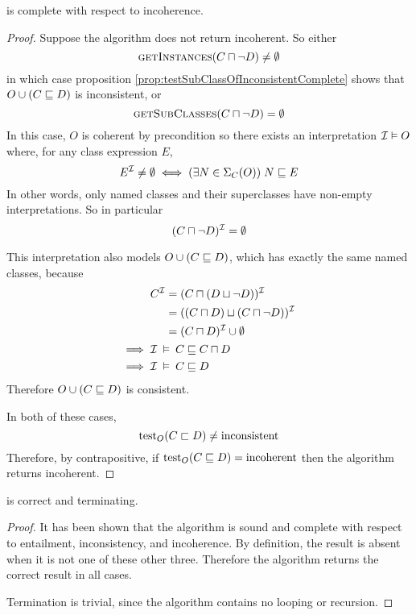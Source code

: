 \documentclass[paper.tex]{subfiles}
\begin{document}
\begin{proposition}
  \label{prop:testSubClassOfIncoherentComplete}
   is complete with respect to incoherence.
\end{proposition}
\begin{proof}
  Suppose the algorithm does not return incoherent.  So either
  \[ \Call{getInstances}{C \sqcap \neg D} \ne \emptyset \]
  in which case proposition \ref{prop:testSubClassOfInconsistentComplete} shows that $O \cup (C \sqsubseteq D)$ is inconsistent, or
  \[ \Call{getSubClasses}{C \sqcap \neg D} = \emptyset \]
  In this case, $O$ is coherent by precondition so there exists an interpretation $\mathcal{I} \vDash O$ where, for any class expression $E$,
  \[ E^{\mathcal{I}} \ne \emptyset \iff (\exists N \in \Sigma_C(O)) \; N \sqsubseteq E \]
  In other words, only named classes and their superclasses have non-empty interpretations.  So in particular
  \[ (C \sqcap \neg D)^{\mathcal{I}} = \emptyset \]

  This interpretation also models $O \cup (C \sqsubseteq D)$, which has exactly the same named classes, because
  \begin{align*}
    & \begin{aligned}
      C^{\mathcal{I}} &= (C \sqcap (D \sqcup \neg D))^{\mathcal{I}} \\
      &= ((C \sqcap D) \sqcup (C \sqcap \neg D))^{\mathcal{I}} \\
      &= (C \sqcap D)^{\mathcal{I}} \cup \emptyset
    \end{aligned} \\
    \implies{}& \mathcal{I} \:\vDash\: C \sqsubseteq C \sqcap D \\
    \implies{}& \mathcal{I} \:\vDash\: C \sqsubseteq D
  \end{align*}
  Therefore $O \cup (C \sqsubseteq D)$ is consistent.

  In both of these cases,
  \[ \operatorname{test}_O(C \sqsubset D) \ne \mathrm{inconsistent} \]
  Therefore, by contrapositive, if $\operatorname{test}_O(C \sqsubseteq D) = \mathrm{incoherent}$ then the algorithm returns incoherent.
\end{proof}

\begin{theorem}
   is correct and terminating.
\end{theorem}
\begin{proof}
  It has been shown that the algorithm is sound and complete with respect to entailment, inconsistency, and incoherence.  By definition, the result is absent when it is not one of these other three.  Therefore the algorithm returns the correct result in all cases.

  Termination is trivial, since the algorithm contains no looping or recursion.
\end{proof}
\end{document}
